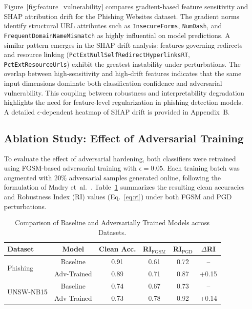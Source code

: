 \documentclass[a4paper,twoside]{article}
\begin{document}
Figure~\ref{fig:feature_vulnerability} compares gradient-based feature sensitivity
and SHAP attribution drift for the Phishing Websites dataset.
The gradient norms identify structural URL attributes such as
\texttt{InsecureForms}, \texttt{NumDash}, and \texttt{FrequentDomainNameMismatch}
as highly influential on model predictions.
A similar pattern emerges in the SHAP drift analysis:
features governing redirects and resource linking
(\texttt{PctExtNullSelfRedirectHyperlinksRT}, \texttt{PctExtResourceUrls})
exhibit the greatest instability under perturbations.
The overlap between high-sensitivity and high-drift features indicates that
the same input dimensions dominate both classification confidence and adversarial vulnerability.
This coupling between robustness and interpretability degradation highlights
the need for feature-level regularization in phishing detection models.
A detailed $\epsilon$-dependent heatmap of SHAP drift is provided in Appendix~B.

\subsection{Ablation Study: Effect of Adversarial Training}

To evaluate the effect of adversarial hardening, both classifiers were retrained
using FGSM-based adversarial training with $\epsilon=0.05$.
Each training batch was augmented with 20\% adversarial samples generated online,
following the formulation of Madry et~al.~\cite{madry2018towards}.
Table~\ref{tab:ablation} summarizes the resulting clean accuracies and
Robustness Index (RI) values (Eq.~\ref{eq:ri}) under both FGSM and PGD perturbations.

\begin{table}[htbp]
\caption{Comparison of Baseline and Adversarially Trained Models across Datasets.}
\centering
\renewcommand{\arraystretch}{1.1}
\setlength{\tabcolsep}{4pt}

\begin{tabular}{l c c c c c}
\toprule
Dataset & Model & Clean Acc. & RI$_{\text{FGSM}}$ & RI$_{\text{PGD}}$ & $\Delta$RI \\
\midrule
\multirow{2}{*}{Phishing} 
  & Baseline & 0.91 & 0.61 & 0.72 & -- \\
  & Adv-Trained & 0.89 & 0.71 & 0.87 & +0.15 \\
\midrule
\multirow{2}{*}{UNSW-NB15}
  & Baseline & 0.74 & 0.67 & 0.73 & -- \\
  & Adv-Trained & 0.73 & 0.78 & 0.92 & +0.14 \\
\bottomrule
\end{tabular}
\label{tab:ablation}
\end{table}
\end{document}
